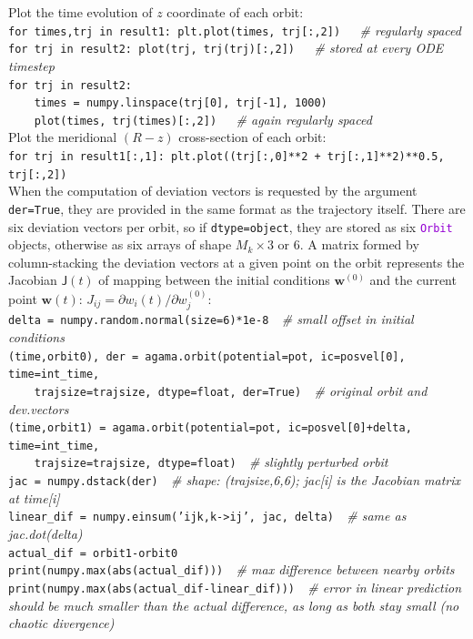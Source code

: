 \documentclass[12pt]{article}
\newcommand{\ttt}[1]{\textcolor{darkviolet}{\texttt{#1}}}
\newcommand{\ppp}[1]{\textcolor{darkolive} {\texttt{#1}}}
\begin{document}
Plot the time evolution of $z$ coordinate of each orbit:\\[1mm]
\texttt{for times,trj in result1: plt.plot(times, trj[:,2])\ \ \ }\textit{\color{Sepia}\# regularly spaced} \\
\texttt{for trj in result2: plot(trj, trj(trj)[:,2])\ \ \ }\textit{\color{Sepia}\# stored at every ODE timestep}\\
\texttt{for trj in result2:\\
\mbox{}~~~~times = numpy.linspace(trj[0], trj[-1], 1000)\\
\mbox{}~~~~plot(times, trj(times)[:,2])\ \ \ }\textit{\color{Sepia}\# again regularly spaced} \\[1mm]
Plot the meridional $(R-z)$ cross-section of each orbit:\\[1mm]
\texttt{for trj in result1[:,1]: plt.plot((trj[:,0]**2 + trj[:,1]**2)**0.5, trj[:,2])}\\[2mm]
When the computation of deviation vectors is requested by the argument \texttt{der=True}, they are provided in the same format as the trajectory itself. There are six deviation vectors per orbit, so if \ppp{dtype}\texttt{=object}, they are stored as six \ttt{Orbit} objects, otherwise as six arrays of shape $M_k\times$3 or 6. A matrix formed by column-stacking the deviation vectors at a given point on the orbit represents the Jacobian $\mathsf{J}(t)$ of mapping between the initial conditions $\boldsymbol w^{(0)}$ and the current point $\boldsymbol w(t)$: $J_{ij} = \partial w_i(t)/\partial w_j^{(0)}$:\\[1mm]
\texttt{delta = numpy.random.normal(size=6)*1e-8\ \ }\textit{\color{Sepia}\# small offset in initial conditions}\\
\texttt{(time,orbit0), der = agama.orbit(potential=pot, ic=posvel[0], time=int_time,\\
\mbox{}~~~~trajsize=trajsize, dtype=float, der=True)\ \ }\textit{\color{Sepia}\# original orbit and dev.vectors}\\
\texttt{(time,orbit1) = agama.orbit(potential=pot, ic=posvel[0]+delta, time=int_time,\\
\mbox{}~~~~trajsize=trajsize, dtype=float)\ \ }\textit{\color{Sepia}\# slightly perturbed orbit}\\
\texttt{jac = numpy.dstack(der)\ \ }\textit{\color{Sepia}\# shape: (trajsize,6,6); jac[i] is the Jacobian matrix at time[i]}\\
\texttt{linear_dif = numpy.einsum('ijk,k->ij', jac, delta)\ \ }\textit{\color{Sepia}\# same as jac.dot(delta)}\\
\texttt{actual_dif = orbit1-orbit0}\\
\texttt{print(numpy.max(abs(actual_dif)))\ \ }\textit{\color{Sepia}\# max difference between nearby orbits}\\
\texttt{print(numpy.max(abs(actual_dif-linear_dif)))\ \ }\textit{\color{Sepia}\# error in linear prediction should be much smaller than the actual difference, as long as both stay small (no chaotic divergence)}
\end{document}
